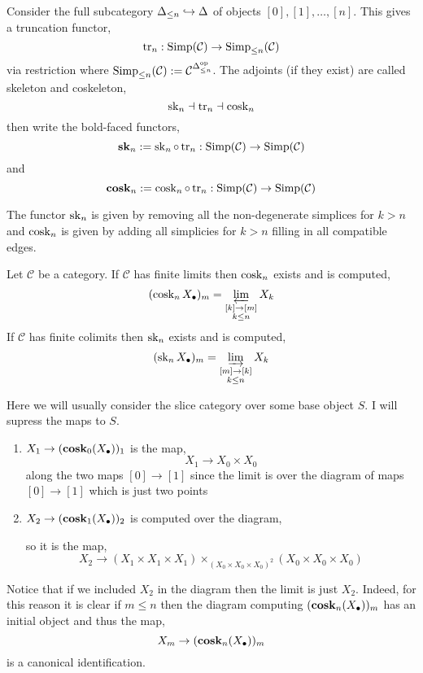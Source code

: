 \documentclass[12pt]{article}
\newcommand{\cC}{\mathcal{C}}
\newcommand{\Simp}{\mathrm{Simp}}
\begin{document}
\begin{defn}
Consider the full subcategory $\Delta_{\le n} \hookrightarrow \Delta$ of objects $[0], [1], \dots, [n]$. This gives a truncation functor,
\[ \tr_n : \Simp(\cC) \to \Simp_{\le n}(\cC) \]
via restriction where $\Simp_{\le n}(\cC) := \cC^{\Delta_{\le n}^\op}$. The adjoints (if they exist) are called skeleton and coskeleton,
\[ \operatorname{\mathrm{sk}}_n \dashv \operatorname{\mathrm{tr}}_n \dashv \operatorname{\mathrm{cosk}}_n \]
then write the bold-faced functors,
\[ \bfsk_n := \sk_n \circ \tr_n : \Simp(\cC) \to \Simp(\cC) \]
and
\[ \bfcosk_n := \cosk_n \circ \tr_n : \Simp(\cC) \to \Simp(\cC) \]
\end{defn}

\begin{rmk}
The functor $\operatorname{\mathrm{sk}}_n$ is given by removing all the non-degenerate simplices for $k > n$ and $\operatorname{\mathrm{cosk}}_n$ is given by adding all simplicies for $k > n$ filling in all compatible edges.
\end{rmk}

\begin{prop}
Let $\cC$ be a category. If $\cC$ has finite limits then $\operatorname{\mathrm{cosk}}_n$ exists and is computed,
\[ (\operatorname{\mathrm{cosk}}_n X_\bullet)_m = \operatorname*{\varprojlim}_{\substack{[k] \to [m] \\ k \le n}} X_k \]
If $\cC$ has finite colimits then $\operatorname{\mathrm{sk}}_n$ exists and is computed,
\[ (\operatorname{\mathrm{sk}}_n X_\bullet)_m = \operatorname*{\varinjlim}_{\substack{[m] \to [k] \\ k \le n}} X_k \]
\end{prop}

\begin{example}
Here we will usually consider the slice category over some base object $S$. I will supress the maps to $S$. 
\begin{enumerate}
\item $X_1 \to (\operatorname{\mathbf{cosk}}_0(X_\bullet))_{1}$ is the map,
\[ X_1 \to X_0 \times X_0 \]
along the two maps $[0] \to [1]$ since the limit is over the diagram of maps $[0] \to [1]$ which is just two points
\item $X_2 \to (\operatorname{\mathbf{cosk}}_1(X_\bullet))_{2}$ is computed over the diagram,
\begin{center}
\end{center}
so it is the map,
\[ X_2 \to (X_1 \times X_1 \times X_1) \times_{(X_0 \times X_0 \times X_0)^2} (X_0 \times X_0 \times X_0)  \]
\end{enumerate}
Notice that if we included $X_2$ in the diagram then the limit is just $X_2$. Indeed, for this reason it is clear if $m \le n$ then the diagram computing $(\operatorname{\mathbf{cosk}}_n(X_\bullet))_m$ has an initial object and thus the map,
\[ X_m \to (\operatorname{\mathbf{cosk}}_n(X_\bullet))_m \]
is a canonical identification. 
\end{example}
\end{document}
